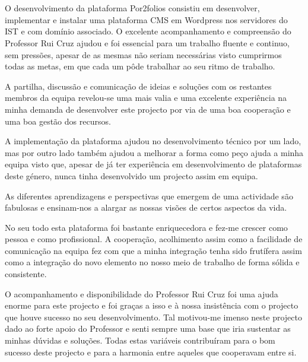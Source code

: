 \documentclass[a4paper,12pt,journal,twoside,compsoc]{PPIEEEtran}
\begin{document}

\section{}

O desenvolvimento da plataforma Por2folios consistiu em desenvolver, implementar e instalar uma plataforma \ac{CMS} em Wordpress nos servidores do \ac{IST} e com domínio associado. O excelente acompanhamento e compreensão do Professor Rui Cruz ajudou e foi essencial para um trabalho fluente e continuo, sem pressões, apesar de as mesmas não seriam necessárias visto cumprirmos todas as metas, em que cada um pôde trabalhar ao seu ritmo de trabalho.

A partilha, discussão e comunicação de ideias e soluções com os restantes membros da equipa revelou-se uma mais valia e uma excelente experiência na minha demanda de desenvolver este projecto por via de uma boa cooperação e uma boa gestão dos recursos.

A implementação da plataforma ajudou no desenvolvimento técnico por um lado, mas por outro lado também ajudou a melhorar a forma como peço ajuda a minha equipa visto que, apesar de já ter experiência em desenvolvimento de plataformas deste género, nunca tinha desenvolvido um projecto assim em equipa.

As diferentes aprendizagens e perspectivas que emergem de uma actividade são fabulosas e ensinam-nos a alargar as nossas visões de certos aspectos da vida.

No seu todo esta plataforma foi bastante enriquecedora e fez-me crescer como pessoa e como profissional. A cooperação, acolhimento assim como a facilidade de comunicação na equipa fez com que a minha integração tenha sido frutífera assim como a integração do novo elemento no nosso meio de trabalho de forma sólida e consistente.

O acompanhamento e disponibilidade do Professor Rui Cruz foi uma ajuda enorme para este projecto e foi graças a isso e à nossa insistência com o projecto que houve sucesso no seu desenvolvimento. Tal motivou-me imenso neste projecto dado ao forte apoio do Professor e senti sempre uma base que iria sustentar as minhas dúvidas e soluções. Todas estas variáveis contribuíram para o bom sucesso deste projecto e para a harmonia entre aqueles que cooperavam entre si.

\end{document}
